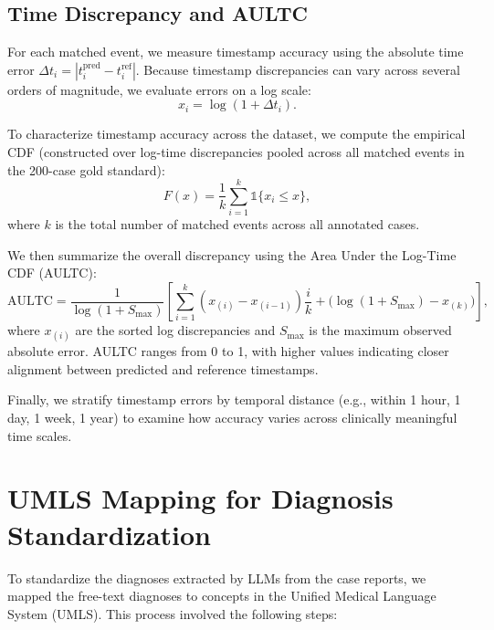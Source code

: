 \documentclass[pdflatex,sn-mathphys-num]{sn-jnl}%
\theoremstyle{thmstyleone}%
\theoremstyle{thmstyletwo}%
\theoremstyle{thmstylethree}%
\begin{document}
\subsection{Time Discrepancy and AULTC}
\label{apd:aultc}

For each matched event, we measure timestamp accuracy using the absolute time error
$\Delta t_i = |t^{\text{pred}}_i - t^{\text{ref}}_i|$.  
Because timestamp discrepancies can vary across several orders of magnitude, we evaluate
errors on a log scale:
\[
x_i = \log(1 + \Delta t_i).
\]

To characterize timestamp accuracy across the dataset, we compute the empirical CDF (constructed over log-time discrepancies pooled across all matched events in the 200-case gold standard):
\[
F(x) = \frac{1}{k} \sum_{i=1}^{k} \mathds{1}\{x_i \le x\},
\]
where $k$ is the total number of matched events across all annotated cases.

We then summarize the overall discrepancy using the Area Under the Log-Time CDF (AULTC):
\[
\text{AULTC} =
\frac{1}{\log(1+S_{\max})}
\left[
\sum_{i=1}^{k}(x_{(i)} - x_{(i-1)})\frac{i}{k}
+
\big( \log(1+S_{\max}) - x_{(k)} \big)
\right],
\]
where $x_{(i)}$ are the sorted log discrepancies and $S_{\max}$ is the maximum observed
absolute error.  
AULTC ranges from 0 to 1, with higher values indicating closer alignment between predicted
and reference timestamps.

Finally, we stratify timestamp errors by temporal distance (e.g., within 1 hour, 1 day, 1 week,
1 year) to examine how accuracy varies across clinically meaningful time scales.





\section{UMLS Mapping for Diagnosis Standardization}
\label{apd:umls-mapping}

To standardize the diagnoses extracted by LLMs from the case reports, we mapped the free-text diagnoses to concepts in the Unified Medical Language System (UMLS). 
This process involved the following steps:
\end{document}
